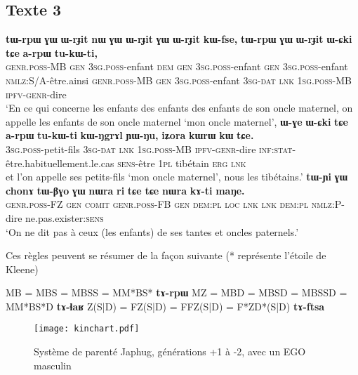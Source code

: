 \documentclass[oneside,a4paper,11pt]{article}
\newcommand{\ipa}[1]{{\phon\textbf{#1}}}
\begin{document}
\subsection{Texte 3}
\begin{exe}
\ex 
\gll 
\ipa{tɯ-rpɯ} 	\ipa{ɣɯ} 	\ipa{ɯ-rɟit} 	\ipa{nɯ} 	\ipa{ɣɯ} 	\ipa{ɯ-rɟit} 	\ipa{ɣɯ} 	\ipa{ɯ-rɟit} 	\ipa{kɯ-fse,}  \ipa{tɯ-rpɯ} 	\ipa{ɣɯ} 	\ipa{ɯ-rɟit} 	\ipa{ɯ-ɕki} 	\ipa{tɕe} 	\ipa{a-rpɯ} 	\ipa{tu-kɯ-ti,} \\
\textsc{genr.poss}-MB \textsc{gen} \textsc{3sg.poss}-enfant \textsc{dem} \textsc{gen} \textsc{3sg.poss}-enfant \textsc{gen} \textsc{3sg.poss}-enfant \textsc{nmlz}:S/A-être.ainsi \textsc{genr.poss}-MB  \textsc{gen} \textsc{3sg.poss}-enfant \textsc{3sg-dat} \textsc{lnk} \textsc{1sg.poss}-MB \textsc{ipfv-genr}-dire \\
\glt `En ce qui concerne les enfants des enfants des enfants de son oncle maternel, on appelle les enfants de son oncle maternel `mon oncle maternel',
\ex 
\gll 
\ipa{ɯ-ɣe} 	\ipa{ɯ-ɕki} 	\ipa{tɕe} 	\ipa{a-rpɯ} 	\ipa{tu-kɯ-ti} 	\ipa{kɯ-ŋgrɤl} 	\ipa{ɲɯ-ŋu,} \ipa{iʑora} 	\ipa{kɯrɯ} 	\ipa{kɯ} 	\ipa{tɕe.} \\
\textsc{3sg.poss}-petit-fils \textsc{3sg-dat} \textsc{lnk} \textsc{1sg.poss}-MB \textsc{ipfv-genr}-dire \textsc{inf:stat}-être.habituellement.le.cas \textsc{sens}-être \textsc{1pl} tibétain \textsc{erg} \textsc{lnk} \\
\glt et l'on appelle ses petits-fils `mon oncle maternel', nous les tibétains.'
\ex 
\gll 
\ipa{tɯ-ɲi} 	\ipa{ɣɯ} 	\ipa{chonɤ} 	\ipa{tɯ-βɣo} 	\ipa{ɣɯ} 	\ipa{nɯra} 	\ipa{ri} 	\ipa{tɕe} 	\ipa{tɕe} 	\ipa{nɯra} 	\ipa{kɤ-ti} 	\ipa{maŋe.} 	\\
\textsc{genr.poss}-FZ \textsc{gen} \textsc{comit} \textsc{genr.poss}-FB \textsc{gen} \textsc{dem:pl} \textsc{loc} \textsc{lnk}  \textsc{lnk}  \textsc{dem:pl} \textsc{nmlz:P}-dire  ne.pas.exister:\textsc{sens} \\
\glt `On ne dit pas à ceux (les enfants) de ses tantes et oncles paternels.'
\end{exe}


Ces règles peuvent se résumer de la façon suivante (* représente l'étoile de Kleene)

\begin{exe}
\ex 
\glt MB = MBS = MBSS = MM*BS* \ipa{tɤ-rpɯ}
\glt MZ = MBD = MBSD = MBSSD = MM*BS*D \ipa{tɤ-ɬaʁ}
\ex 
\glt Z(S|D) = FZ(S|D) = FFZ(S|D) = F*ZD*(S|D) \ipa{tɤ-ftsa}
\end{exe}
%
\begin{figure}[H]
\caption{Système de parenté Japhug, générations +1 à -2, avec un EGO masculin} \label{fig:parente}
\texttt{[image: kinchart.pdf]}
\end{figure}
\end{document}
